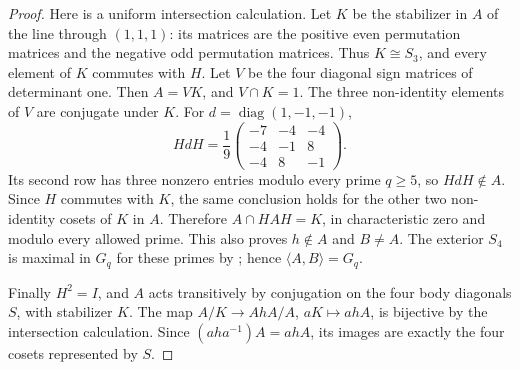 \begin{proof}
Here is a uniform intersection calculation. Let $K$ be the stabilizer in
$A$ of the line through $(1,1,1)$: its matrices are the positive even
permutation matrices and the negative odd permutation matrices. Thus
$K\cong S_3$, and every element of $K$ commutes with $H$.
Let $V$ be the four diagonal sign matrices of determinant one. Then
$A=VK$, and $V\cap K=1$. The three non-identity elements of $V$ are
conjugate under $K$. For $d=\operatorname{diag}(1,-1,-1)$,
\[
 HdH=\frac19\begin{pmatrix}-7&-4&-4\\-4&-1&8\\-4&8&-1\end{pmatrix}.
\]
Its second row has three nonzero entries modulo every prime $q\ge5$,
so $HdH\notin A$. Since $H$ commutes with $K$, the same conclusion
holds for the other two non-identity cosets of $K$ in $A$.
Therefore $A\cap HAH=K$, in characteristic zero and modulo every
allowed prime. This also proves $h\notin A$ and $B\ne A$.
The exterior $S_4$ is maximal in $G_q$ for these primes by
\cite[Theorem 3.5]{Giudici2007}; hence $\langle A,B\rangle=G_q$.

Finally $H^2=I$, and $A$ acts transitively by conjugation on the four
body diagonals $S$, with stabilizer $K$. The map
$A/K\longrightarrow AhA/A$, $aK\mapsto ahA$, is bijective by the
intersection calculation. Since $(aha^{-1})A=ahA$, its images are
exactly the four cosets represented by $S$.
\end{proof}

